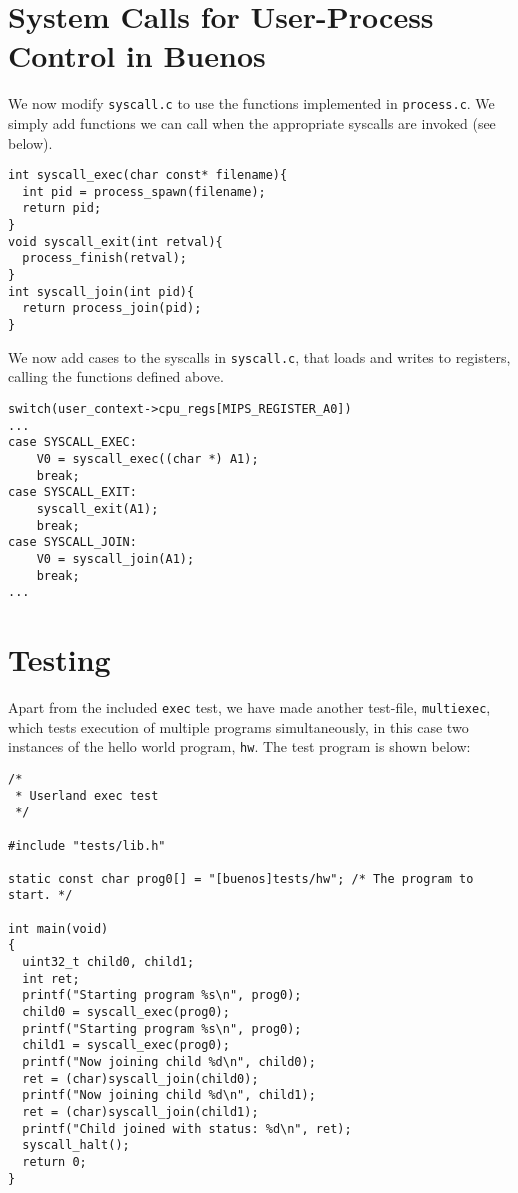 \documentclass[a4paper,12pt]{article}
\begin{document}
\section{System Calls for User-Process Control in Buenos}
We now modify \texttt{syscall.c} to use the functions implemented in \texttt{process.c}. We simply add functions we can call when the appropriate syscalls are invoked (see below).
\begin{lstlisting}
int syscall_exec(char const* filename){
  int pid = process_spawn(filename);
  return pid;
}
void syscall_exit(int retval){
  process_finish(retval);
}
int syscall_join(int pid){
  return process_join(pid);
}
\end{lstlisting}

We now add cases to the syscalls in \texttt{syscall.c}, that loads and writes to registers, calling the functions defined above.
\begin{lstlisting}
switch(user_context->cpu_regs[MIPS_REGISTER_A0])
...
case SYSCALL_EXEC:
    V0 = syscall_exec((char *) A1);
    break;
case SYSCALL_EXIT:
    syscall_exit(A1);
    break;
case SYSCALL_JOIN:
    V0 = syscall_join(A1);
    break;
...
\end{lstlisting}

\section{Testing}
Apart from the included \texttt{exec} test, we have made another test-file, \texttt{multiexec}, which tests execution of multiple programs simultaneously, in this case two instances of the hello world program, \texttt{hw}. The test program is shown below:

\begin{lstlisting}
/*
 * Userland exec test
 */

#include "tests/lib.h"

static const char prog0[] = "[buenos]tests/hw"; /* The program to start. */

int main(void)
{
  uint32_t child0, child1;
  int ret;
  printf("Starting program %s\n", prog0);
  child0 = syscall_exec(prog0);
  printf("Starting program %s\n", prog0);
  child1 = syscall_exec(prog0);
  printf("Now joining child %d\n", child0);
  ret = (char)syscall_join(child0); 
  printf("Now joining child %d\n", child1);
  ret = (char)syscall_join(child1);
  printf("Child joined with status: %d\n", ret);
  syscall_halt();
  return 0;
}
\end{lstlisting}
\end{document}
